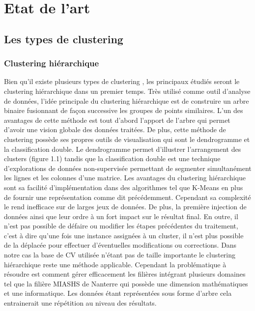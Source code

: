 \documentclass[memoire]{subfiles}
\begin{document}

\chapter{Etat de l'art}
	\section{Les types de clustering}
		\subsection{Clustering hiérarchique}
Bien qu'il existe plusieurs types de clustering \cite{ref1}, les principaux étudiés seront le clustering hiérarchique dans un premier temps. Très utilisé comme outil d'analyse de données, l'idée principale du clustering hiérarchique est de construire un arbre binaire fusionnant de façon successive les groupes de points similaires. L'un des avantages de cette méthode est tout d'abord l'apport de l'arbre qui permet d'avoir une vision globale des données traitées. De plus, cette méthode de clustering possède ses propres outils de visualisation qui sont le dendrogramme et la classification double. Le dendrogramme permet d'illustrer l'arrangement des clusters (figure 1.1)  tandis que la classification double est une technique d'explorations de données non-supervisée permettant de segmenter simultanément les lignes et les colonnes d'une matrice. Les avantages du clustering hiérarchique sont sa facilité d'implémentation dans des algorithmes tel que K-Means en plus de fournir une représentation comme dit précédemment. Cependant sa complexité le rend inefficace sur de larges jeux de données. De plus, la première injection de données ainsi que leur  ordre à un fort impact sur le résultat final. En outre, il n'est pas possible de défaire ou modifier les étapes précédentes du traitement, c'est à dire qu'une fois une instance assignées à un cluster, il n'est plus possible de la déplacée pour effectuer d'éventuelles modifications ou corrections. Dans notre cas la base de CV utilisée n'étant pas de taille importante le clustering hiérarchique reste une méthode applicable. Cependant la problématique à résoudre est comment gérer efficacement les filières intégrant plusieurs domaines tel que la filière MIASHS de Nanterre qui possède une dimension mathématiques et une informatique. Les données étant représentées sous forme d'arbre cela entrainerait une répétition au niveau des résultats.
\end{document}
